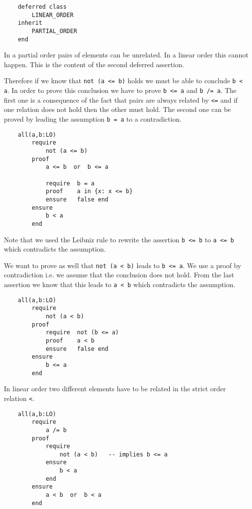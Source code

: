\begin{lstlisting}
    deferred class
        LINEAR_ORDER
    inherit
        PARTIAL_ORDER
    end
\end{lstlisting}

In a partial order pairs of elements can be unrelated. In a linear order this
cannot happen. This is the content of the second deferred assertion.

Therefore if we know that \lstinline!not (a <= b)! holds we must be able to
conclude \lstinline!b < a!. In order to prove this conclusion we have to prove
\lstinline!b <= a! and \lstinline!b /= a!. The first one is a consequence of
the fact that pairs are always related by \lstinline!<=! and if one relation
does not hold then the other must hold. The second one can be proved by
leading the assumption \lstinline!b = a! to a contradiction.

\begin{lstlisting}
    all(a,b:LO)
        require
            not (a <= b)
        proof
            a <= b  or  b <= a

            require  b = a
            proof    a in {x: x <= b}
            ensure   false end
        ensure
            b < a
        end
\end{lstlisting}
%
Note that we used the Leibniz rule to rewrite the assertion \lstinline!b <= b!
to \lstinline!a <= b! which contradicts the assumption.

We want to prove as well that \lstinline!not (a < b)!  leads to
\lstinline!b <= a!. We use a proof by contradiction i.e. we assume that the
conclusion does not hold. From the last assertion we know that this leads to
\lstinline!a < b!  which contradicts the assumption.

\begin{lstlisting}
    all(a,b:LO)
        require
            not (a < b)
        proof
            require  not (b <= a)
            proof    a < b
            ensure   false end
        ensure
            b <= a
        end
\end{lstlisting}

In linear order two different elements have to be related in the strict order
relation \lstinline!<!.

\begin{lstlisting}
    all(a,b:LO)
        require
            a /= b
        proof
            require
                not (a < b)   -- implies b <= a
            ensure
                b < a
            end
        ensure
            a < b  or  b < a
        end
\end{lstlisting}

